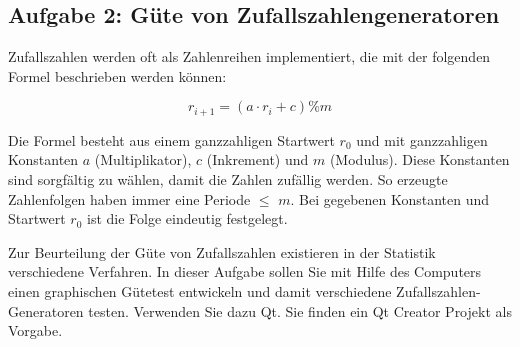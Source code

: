 


\subsection{Aufgabe 2: Güte von Zufallszahlengeneratoren}
Zufallszahlen werden oft als Zahlenreihen implementiert, die mit der folgenden Formel beschrieben werden können:

\begin{equation}
  r_{i+1} = (a \cdot r_i + c) \% m
\end{equation}

Die Formel besteht aus einem ganzzahligen Startwert $r_0$ und mit ganzzahligen Konstanten $a$ (Multiplikator), $c$ (Inkrement) und $m$ (Modulus). Diese Konstanten sind sorgfältig zu wählen, damit die Zahlen zufällig werden. So erzeugte Zahlenfolgen haben immer eine Periode $\leq$ $m$. Bei gegebenen Konstanten und Startwert $r_0$ ist die Folge eindeutig festgelegt.


Zur Beurteilung der Güte von Zufallszahlen existieren in der Statistik verschiedene Verfahren. In dieser Aufgabe sollen Sie mit Hilfe des Computers einen graphischen Gütetest entwickeln und damit verschiedene Zufallszahlen-Generatoren testen. Verwenden Sie dazu Qt. Sie finden ein Qt Creator Projekt als Vorgabe.

